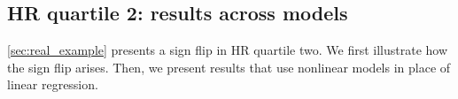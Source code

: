 




    
    
\subsection*{HR quartile 2: results across models}
\label{appendix:hrq2}

\cref{sec:real_example} presents a sign flip in HR quartile two. We first illustrate how the sign flip arises. Then, we present results that use nonlinear models in place of linear regression.

